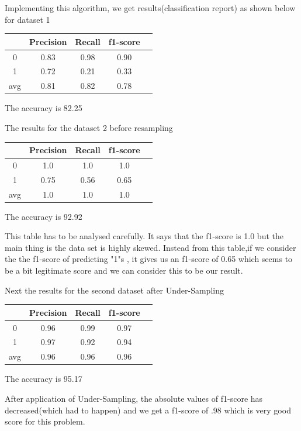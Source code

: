  Implementing this algorithm, we get results(classification report) as shown below for dataset 1
\begin{center}
\begin{tabular}{| c | c | c | c | c |}
\hline
    & Precision & Recall & f1-score \\
\hline
0 & 0.83 & 0.98 & 0.90 \\
\hline
1 & 0.72 & 0.21 & 0.33 \\
\hline
avg & 0.81 & 0.82 & 0.78 \\
\hline
\end{tabular}
\end{center} 
\begin{center}
The accuracy is 82.25%
\end{center}
 The results for the dataset 2 before resampling
\begin{center}
\begin{tabular}{| c | c | c | c | c |}
\hline
    & Precision & Recall & f1-score\\
\hline
0 & 1.0 & 1.0 & 1.0 \\
\hline
1 & 0.75 & 0.56 & 0.65 \\
\hline
avg & 1.0 & 1.0 & 1.0 \\
\hline
\end{tabular}
\end{center}
\begin{center}
The accuracy is 92.92%
\end{center} 
 This table has to be analysed carefully. It says that the f1-score is 1.0 but the main thing is the data set is highly skewed. Instead from this table,if we consider the the f1-score of predicting "1"s , it gives us an f1-score of 0.65 which seems to be a bit legitimate score and we can consider this to be our result.\par
 Next the results for the second dataset after Under-Sampling
 \begin{center}
\begin{tabular}{| c | c | c | c | c |}
\hline
    & Precision & Recall & f1-score \\
\hline
0 & 0.96 & 0.99 & 0.97 \\
\hline
1 & 0.97 & 0.92 & 0.94 \\
\hline
avg & 0.96 & 0.96 & 0.96 \\
\hline
\end{tabular}
\end{center} 
\begin{center}
The accuracy is 95.17%
\end{center}
After application of Under-Sampling, the absolute values of f1-score has decreased(which had to happen) and we get a f1-score of .98 which is very good score for this problem.
